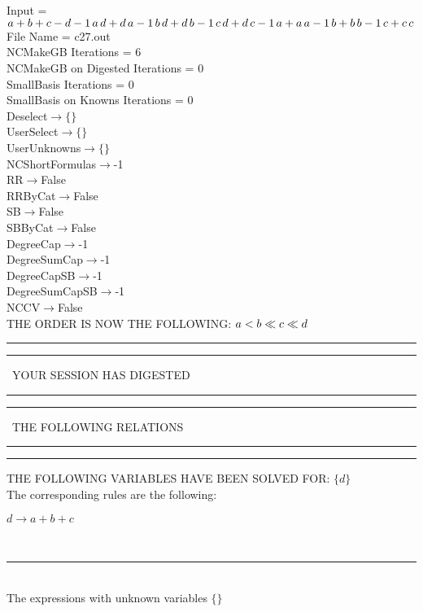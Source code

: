 \documentclass[rep10,leqno]{report}
\begin{document}
\normalsize
\baselineskip=12pt
\noindent
Input = 
$
\\a + b + c - d\\
-1\,
 a\,
 d + d\,
 a\\
-1\,
 b\,
 d + d\,
 b\\
-1\,
 c\,
 d + d\,
 c\\
-1\,
 a + a\,
 a\\
-1\,
 b + b\,
 b\\
-1\,
 c + c\,
 c\\
$
File Name = c27.out\\
NCMakeGB Iterations = 6\\
NCMakeGB on Digested Iterations = 0\\
SmallBasis Iterations = 0\\
SmallBasis on Knowns Iterations = 0\\
Deselect$\rightarrow \{\}$\\
UserSelect$\rightarrow \{\}$\\
UserUnknowns$\rightarrow \{\}$\\
NCShortFormulas$\rightarrow$-1\\
RR$\rightarrow $False\\
RRByCat$\rightarrow $False\\
SB$\rightarrow $False\\
SBByCat$\rightarrow $False\\
DegreeCap$\rightarrow $-1\\
DegreeSumCap$\rightarrow $-1\\
DegreeCapSB$\rightarrow $-1\\
DegreeSumCapSB$\rightarrow $-1\\
NCCV$\rightarrow $False\\
THE ORDER IS NOW THE FOLLOWING:\hfil\break
$
a<b\ll
c\ll
d\\
$
\rule[2pt]{6in}{4pt}\hfil\break
\rule[2pt]{1.879in}{4pt}
\ YOUR SESSION HAS DIGESTED\ 
\rule[2pt]{1.879in}{4pt}\hfil\break
\rule[2pt]{1.923in}{4pt}
\ THE FOLLOWING RELATIONS\ 
\rule[2pt]{1.923in}{4pt}\hfil\break
\rule[2pt]{6in}{4pt}\hfil\break
THE FOLLOWING VARIABLES HAVE BEEN SOLVED FOR:\hfil\break
$\{d\}$
\smallskip\\
The corresponding rules are the following:\smallskip\\
\begin{minipage}{6in}
$
d\rightarrow a + b + c
$
\end{minipage}\medskip\\
\rule[3pt]{6in}{.7pt}\\
The expressions with unknown variables $\{\}$\\
\end{document}
